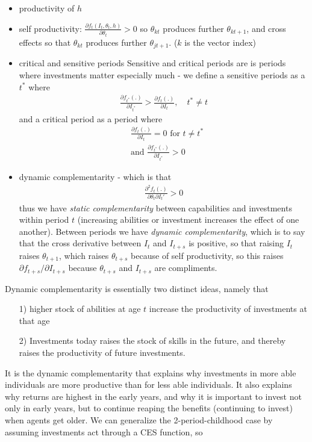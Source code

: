\documentclass[12pt, a4paper]{article}
\begin{document}
\begin{multicols}{2}
\begin{itemize}
\item productivity of $h$ 
\item self productivity: $\frac{\partial f_t(I_t, \theta_t, h)}{\partial \theta_t}>0$ so $\theta_{kt}$ produces further $\theta_{kt+1}$, and cross effects so that $\theta_{kt}$ produces further $\theta_{jt+1}$. ($k$ is the vector index)
\item critical and sensitive periods
Sensitive and critical periods are is periods where investments matter especially much - we define a sensitive periods as a $t^*$ where
\begin{align*}
\frac{\partial f_{t^*}(.) }{\partial I_{t^*}} > \frac{\partial f_t(.) }{\partial I_t }, \quad t^* \neq t
\end{align*}
and a critical period as a period where 
\begin{align*}
&\frac{\partial f_t(.) }{\partial I_t } = 0 \text{ for } t \neq t^* \\
&\text{and } \frac{\partial f_{t^*}(.) }{\partial I_{t^*}}>0
\end{align*}
\item dynamic complementarity - which is that
\begin{align*}
\frac{\partial^2 f_t(.)}{\partial \theta_t \partial I_t'}>0
\end{align*}
thus we have \textit{static complementarity} between capabilities and investments within period $t$ (increasing abilities or investment increases the effect of one another). Between periods we have \textit{dynamic complementarity}, which is to say that the cross derivative between $I_t$ and $I_{t+s}$ is positive, so that raising $I_t$ raises $\theta_{t+1}$, which raises $\theta_{t+s}$ because of self productivity, so this raises $\partial f_{t+s}/\partial I_{t+s}$ because $\theta_{t+s}$ and $I_{t+s}$ are compliments.
\end{itemize}
Dynamic complementarity is essentially two distinct ideas, namely that 
\begin{itemize}
\item[1)] higher stock of abilities at age $t$ increase the productivity of investments at that age
\item[2)] Investments today raises the stock of skills in the future, and thereby raises the productivity of future investments.
\end{itemize}
It is the dynamic complementarity that explains why investments in more able individuals are more productive than for less able individuals. It also explains why returns are highest in the early years, and why it is important to invest not only in early years, but to continue reaping the benefits (continuing to invest) when agents get older. We can generalize the 2-period-childhood case by assuming investments act through a CES function, so

\end{multicols}
\end{document}
